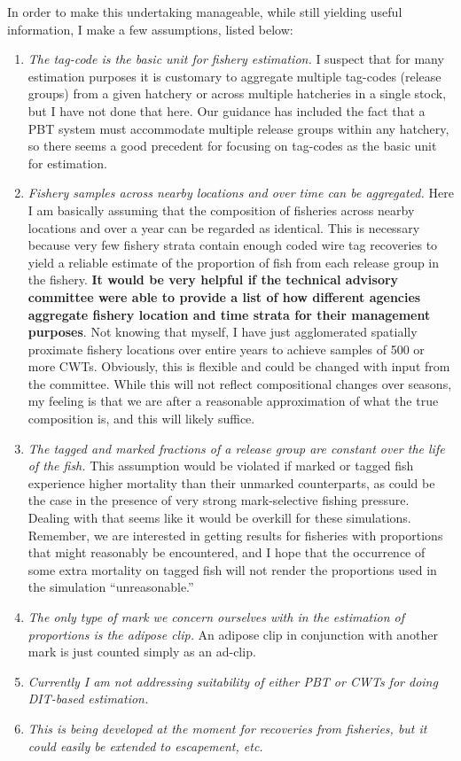 \documentclass[11pt]{article}
\makeatletter
\newcommand{\etc}{{\em etc.}\@\xspace}
\makeatother
\begin{document}
In order to make this undertaking manageable, while still yielding useful information, I make
a few assumptions, listed below:
\begin{enumerate}
\item {\sl The tag-code is the basic unit for fishery estimation.} I suspect that for many estimation purposes
it is customary to aggregate multiple tag-codes (release groups) from a given hatchery or across multiple
hatcheries in a single stock, but I have not done that here.  Our guidance has included the fact that a 
PBT system must accommodate multiple release groups within any hatchery, so
there seems a good precedent for focusing on tag-codes as the basic unit for estimation.
\item {\sl Fishery samples across nearby locations and over time can be aggregated. } Here I am basically assuming
that the composition of fisheries across nearby locations and over a year can be regarded as identical.  This is
necessary because very few fishery strata contain enough coded wire tag recoveries to yield a reliable estimate
of the proportion of fish from each release group in the fishery. {\bf It would be very helpful if the technical
advisory committee were able to provide a list of how
different agencies aggregate fishery location and time strata for their management purposes}.
Not knowing that myself, I have just agglomerated spatially
proximate fishery locations over entire years to achieve samples of 500 or more CWTs.  Obviously, this is 
flexible and could be changed with input from the committee.   While this will not
reflect compositional changes over seasons, my feeling is
that we are after a reasonable approximation of what the true composition is, and this will likely
suffice.
\item {\sl The tagged and marked fractions of a release group are constant over the life of the fish.}  This
assumption would be violated if marked or tagged fish experience higher mortality than their unmarked
counterparts, as could be the case in the presence of very strong mark-selective fishing pressure.  Dealing with
that seems like it would be overkill for these simulations.  Remember, we are interested in getting results
for fisheries with proportions that might reasonably be encountered, and I hope that the occurrence of
some extra mortality on tagged fish will not render the proportions used in the simulation ``unreasonable.''
\item {\sl The only type of mark we concern ourselves with in the estimation of proportions is the
adipose clip.}  An adipose clip in conjunction with another mark is just counted simply as an ad-clip.
\item {\sl Currently I am not addressing suitability of either PBT or CWTs for doing DIT-based estimation.}
\item {\sl This is being developed at the moment for recoveries from fisheries, but it could easily be extended to
escapement, \etc}
\end{enumerate}
\end{document}
